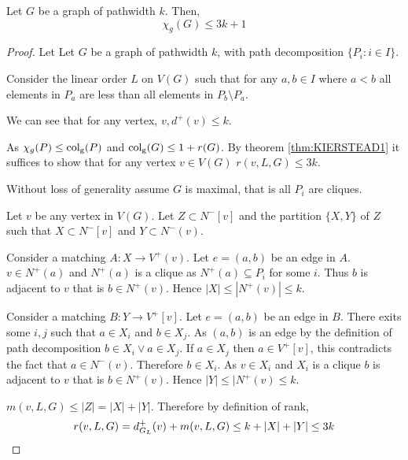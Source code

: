 \begin{theorem}\label{thm_pathwidth}
    Let $G$ be a graph of pathwidth $k$. Then, 
    \[\chi_g(G) \leq 3k + 1\]    
\end{theorem}

\begin{proof}
    Let Let $G$ be a graph of pathwidth $k$, with path decomposition $\{P_i:i\in I\}$. 

    Consider the linear order $L$ on $V(G)$ such that for any $a,b\in I$ where $a<b$ all elements in $P_a$ are less than all elements in $P_b\setminus P_a$.  
        
    
    We can see that for any vertex, $v, d^+(v) \leq k$.
    
    As $\chi_g(P) \leq{\operatorname{col_g}}(P)$ and $\operatorname{col_g}(G)\leq 1+r(G)$. By theorem \ref{thm:KIERSTEAD1} it suffices to show that for any vertex $v \in V(G)$ $r(v,L,G) \leq 3k$. 
    
    Without loss of generality assume $G$ is maximal, that is all $P_i$ are cliques.
    
    Let $v$ be any vertex in $V(G)$. Let $Z \subset N^-[v]$ and the partition $\{X,Y\}$ of $Z$ such that $X\subset N^-[v]$ and  $Y\subset N^-(v)$. 
    
    Consider a matching $A\colon X \to V^+(v)$. Let $e=(a,b)$ be an edge in $A$. $v\in N^+(a)$ and $N^+(a)$ is a clique as $N^+(a) \subseteq P_i$ for some $i$. Thus $b$ is adjacent to $v$ that is $b\in N^+(v)$. Hence $|X|\leq|N^+(v)|\leq k$. 
    
    Consider a matching $B\colon Y \to V^+[v]$. Let $e=(a,b)$ be an edge in $B$. %
    There exits some $i,j$ such that $a\in X_i$ and $b\in X_j$. As $(a,b)$ is an edge by the definition of path decomposition $b\in X_i \lor a\in X_j$. If $a \in X_j$ then $a \in V^+[v]$, this contradicts the fact that $a\in N^-(v)$. Therefore $b\in X_i$. As $v\in X_i$ and $X_i$ is a clique $b$ is adjacent to $v$ that is $b\in N^+(v)$. Hence $|Y|\leq|N^+(v)\leq k$.  
    
    $m(v,L,G) \leq |Z| = |X|+|Y|$. Therefore by definition of rank, \[r(v,L,G) = d^+_{G_L}(v) + m(v,L,G) \leq k + |X|+|Y| \leq 3k\qedhere\]
\end{proof}
